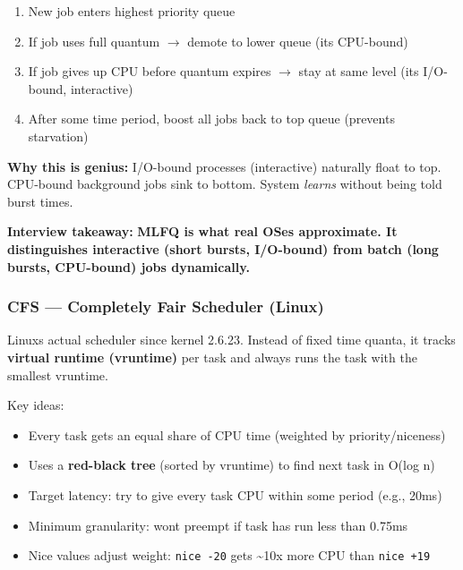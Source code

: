 \documentclass[11pt]{article}
\providecommand{\tightlist}{\setlength{\itemsep}{1pt}\setlength{\parskip}{0pt}}
\begin{document}
\begin{enumerate}
\def\labelenumi{\arabic{enumi}.}
\tightlist
\item
  New job enters highest priority queue
\item
  If job uses full quantum \(\rightarrow\) demote to lower queue (it\textquotesingle s CPU-bound)
\item
  If job gives up CPU before quantum expires \(\rightarrow\) stay at same level (it\textquotesingle s I/O-bound, interactive)
\item
  After some time period, boost all jobs back to top queue (prevents starvation)
\end{enumerate}

\textbf{Why this is genius:} I/O-bound processes (interactive) naturally float to top. CPU-bound background jobs sink to bottom. System \emph{learns} without being told burst times.

\textbf{Interview takeaway:} \textbf{MLFQ is what real OSes approximate. It distinguishes interactive (short bursts, I/O-bound) from batch (long bursts, CPU-bound) jobs dynamically.}

\subsubsection{CFS --- Completely Fair Scheduler (Linux)}\label{cfs--completely-fair-scheduler-linux}

Linux\textquotesingle s actual scheduler since kernel 2.6.23. Instead of fixed time quanta, it tracks \textbf{virtual runtime (vruntime)} per task and always runs the task with the smallest vruntime.

Key ideas:

\begin{itemize}
\tightlist
\item
  Every task gets an equal share of CPU time (weighted by priority/niceness)
\item
  Uses a \textbf{red-black tree} (sorted by vruntime) to find next task in O(log n)
\item
  Target latency: try to give every task CPU within some period (e.g., 20ms)
\item
  Minimum granularity: won\textquotesingle t preempt if task has run less than 0.75ms
\item
  Nice values adjust weight: \texttt{nice\ -20} gets \textasciitilde10x more CPU than \texttt{nice\ +19}
\end{itemize}

\setcodelang{}
\end{document}
